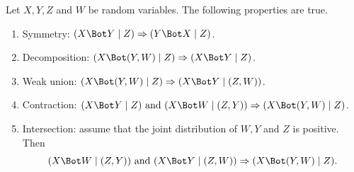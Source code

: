 \begin{proposition}
\label{prop:cind}
Let $X,Y,Z$ and $W$ be random variables. The following properties are true.
\begin{enumerate}[label=(CI\arabic*)]
\item Symmetry: $(X\indp Y\mid Z) \Rightarrow (Y\indp X\mid Z)$.
\item Decomposition: $(X\indp (Y, W)\mid Z) \Rightarrow (X\indp Y\mid Z)$.
\item Weak union: $(X\indp (Y,W)\mid Z)  \Rightarrow
(X\indp Y\mid (Z,W))$.
\item Contraction: $\cind{X}{Y}{Z} \text{ and } \cind{X}{W}{(Z,Y)} \Rightarrow
\cind{X}{(Y,W)}{Z}$.
\item Intersection: assume that the joint distribution of $W,Y$
  and $Z$ is positive. Then
\[
\cind{X}{W}{(Z,Y)} \text{ and } \cind{X}{Y}{(Z,W)}
\Rightarrow \cind{X}{(Y,W)}{Z}.
\]
\end{enumerate}
\end{proposition}
